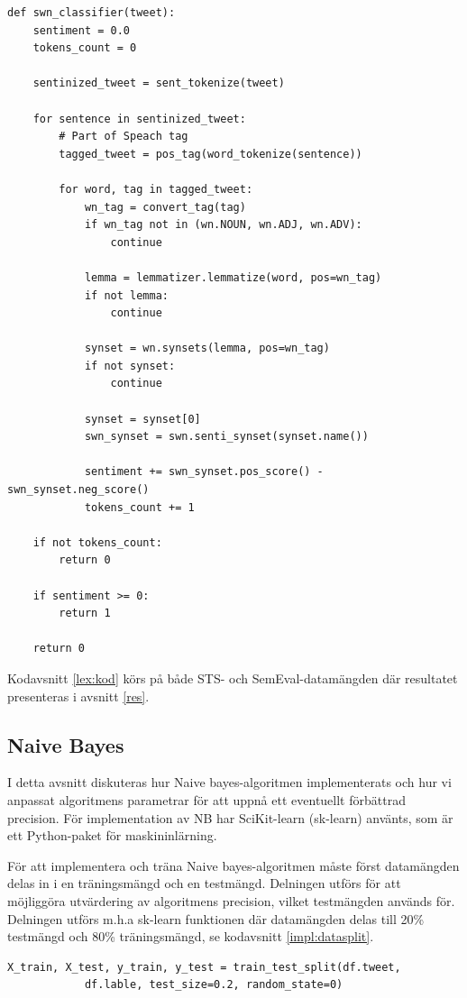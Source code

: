 \documentclass{kaumasters} %
\begin{document}
\begin{lstlisting}[style=mypython,caption={Funktion för att klassificera twitterinlägg m.h.a WordNet och SentiWordNet.},label=lex:kod]
def swn_classifier(tweet):
    sentiment = 0.0
    tokens_count = 0

    sentinized_tweet = sent_tokenize(tweet)

    for sentence in sentinized_tweet:
        # Part of Speach tag
        tagged_tweet = pos_tag(word_tokenize(sentence))

        for word, tag in tagged_tweet:
            wn_tag = convert_tag(tag)
            if wn_tag not in (wn.NOUN, wn.ADJ, wn.ADV):
                continue

            lemma = lemmatizer.lemmatize(word, pos=wn_tag)
            if not lemma:
                continue

            synset = wn.synsets(lemma, pos=wn_tag)
            if not synset:
                continue

            synset = synset[0]
            swn_synset = swn.senti_synset(synset.name())

            sentiment += swn_synset.pos_score() - swn_synset.neg_score()
            tokens_count += 1

    if not tokens_count:
        return 0

    if sentiment >= 0:
        return 1

    return 0
\end{lstlisting}
Kodavsnitt \ref{lex:kod} körs på både STS- och SemEval-datamängden där resultatet presenteras i avsnitt \ref{res}.

\subsection{Naive Bayes}\label{impl:nb}
I detta avsnitt diskuteras hur Naive bayes-algoritmen implementerats och hur vi anpassat algoritmens parametrar för att uppnå ett eventuellt förbättrad precision. För implementation av NB har SciKit-learn (sk-learn) \cite{scikit:002} använts, som är ett Python-paket för maskininlärning.

För att implementera och träna Naive bayes-algoritmen måste först datamängden delas in i en träningsmängd och en testmängd. Delningen utförs för att möjliggöra utvärdering av algoritmens precision, vilket testmängden används för. Delningen utförs m.h.a sk-learn funktionen  \cite{scikit:003} där datamängden delas till 20\% testmängd och 80\% träningsmängd, se kodavsnitt \ref{impl:datasplit}.
\begin{lstlisting}[style=mypython,caption={Kod för att dela upp datamängden i en träningsmängd och en testmängd.},label=impl:datasplit]
X_train, X_test, y_train, y_test = train_test_split(df.tweet,
            df.lable, test_size=0.2, random_state=0)
\end{lstlisting}
\end{document}
